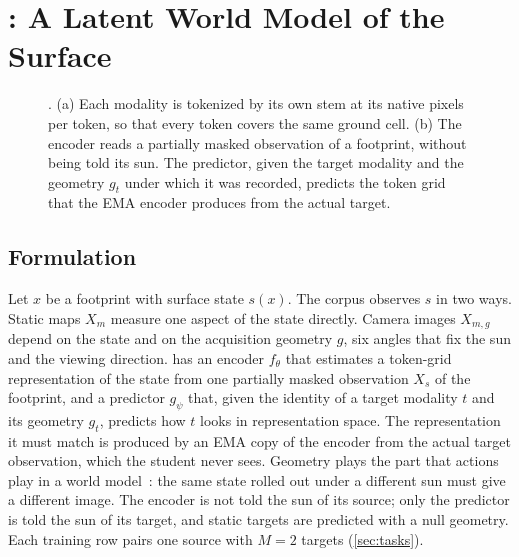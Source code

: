 \section{\method: A Latent World Model of the Surface}
\label{sec:method}

\begin{figure}[t]
  \centering
  \resizebox{\textwidth}{!}{}
  \caption{\method. (a) Each modality is tokenized by its own stem at its native pixels per token, so that every token covers the same ground cell. (b) The encoder reads a partially masked observation of a footprint, without being told its sun. The predictor, given the target modality and the geometry $g_t$ under which it was recorded, predicts the token grid that the EMA encoder produces from the actual target.}
  \label{fig:overview}
\end{figure}

\subsection{Formulation}
\label{sec:formulation}

Let $x$ be a footprint with surface state $s(x)$. The corpus observes $s$ in two ways. Static maps $X_m$ measure one aspect of the state directly. Camera images $X_{m,g}$ depend on the state and on the acquisition geometry $g$, six angles that fix the sun and the viewing direction. \method has an encoder $f_\theta$ that estimates a token-grid representation of the state from one partially masked observation $X_s$ of the footprint, and a predictor $g_\psi$ that, given the identity of a target modality $t$ and its geometry $g_t$, predicts how $t$ looks in representation space. The representation it must match is produced by an EMA copy of the encoder from the actual target observation, which the student never sees. Geometry plays the part that actions play in a world model~\cite{lecun2022path}: the same state rolled out under a different sun must give a different image. The encoder is not told the sun of its source; only the predictor is told the sun of its target, and static targets are predicted with a null geometry. Each training row pairs one source with $M{=}2$ targets (\cref{sec:tasks}).

